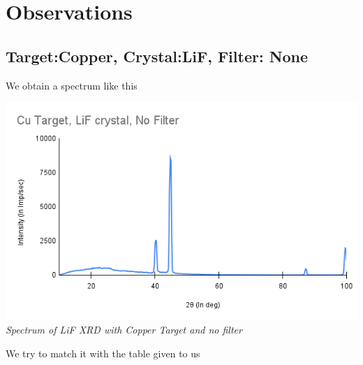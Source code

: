 \documentclass[]{report}[12 pt]
\begin{document}
	\section*{Observations}
	\subsection*{Target:Copper, Crystal:LiF, Filter: None}
	We obtain a spectrum like this\\
	\begin{center}
		\includegraphics[width=10 cm]{Cu Target, LiF crystal, No Filter.png}\\
		\textit{Spectrum of LiF XRD with Copper Target and no filter}
	\end{center}
	We try to match it with the table given to us
\end{document}
